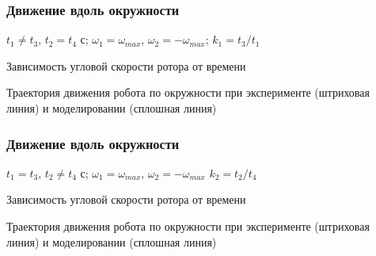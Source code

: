 \begin{frame}
\frametitle{Движение вдоль окружности}

	$t_1 \neq t_3$, $t_2 = t_4$ с; \quad	$ \omega_1 = \omega_{max} $, $ \omega_2 = -\omega_{max} $; \quad $ k_1 = t_3 / t_1 $
		
	\vspace{4mm}
		
	 \begin{minipage}[t]{0.47\linewidth}
		{Зависимость угловой скорости ротора от времени \\}
		\vspace{2mm}
	\end{minipage}
	\hfill
	\begin{minipage}[t]{0.47\linewidth}
		{Траектория движения робота по окружности при эксперименте (штриховая линия) и моделировании (сплошная линия)}
	\end{minipage}

\end{frame}


\begin{frame}
\frametitle{Движение вдоль окружности}
	
	 $t_1 = t_3$, $t_2 \neq t_4$ с; \quad $ \omega_1 = \omega_{max} $, $ \omega_2 = -\omega_{max} $ \quad $ k_2 = t_2 / t_4 $

	\vspace{4mm}
	
\begin{minipage}[t]{0.47\linewidth}
	{Зависимость угловой скорости ротора от времени \\}
\end{minipage}
\hfill
\begin{minipage}[t]{0.47\linewidth}
	{Траектория движения робота по окружности при эксперименте (штриховая линия) и моделировании (сплошная линия)}
\end{minipage}

\end{frame}

